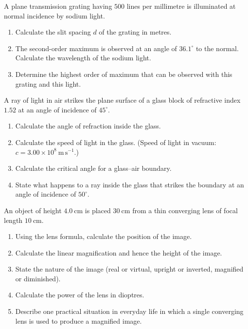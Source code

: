 \documentclass[11pt]{article}
\newcounter{popsec}
\newcounter{popsub}
\newcommand{\courssub}[1]{%
  \stepcounter{popsub}%
  \par\vspace{9pt}\noindent{\popxbold\fontsize{11.5}{13}\selectfont\color{popink}{\color{poporange}\thepopsec.\thepopsub}\hspace{6pt}#1}\par\nopagebreak\vspace{4pt}
}
\begin{document}
\courssub{I practise}

\begin{exercice}
A plane transmission grating having $500$ lines per millimetre is illuminated at normal incidence by sodium light.
\begin{enumerate}
\item Calculate the slit spacing $d$ of the grating in metres.
\item The second-order maximum is observed at an angle of $36.1^{\circ}$ to the normal. Calculate the wavelength of the sodium light.
\item Determine the highest order of maximum that can be observed with this grating and this light.
\end{enumerate}
\end{exercice}

\begin{exercice}
A ray of light in air strikes the plane surface of a glass block of refractive index $1.52$ at an angle of incidence of $45^{\circ}$.
\begin{enumerate}
\item Calculate the angle of refraction inside the glass.
\item Calculate the speed of light in the glass. (Speed of light in vacuum: $c = 3.00\times10^{8}\ \mathrm{m\,s^{-1}}$.)
\item Calculate the critical angle for a glass--air boundary.
\item State what happens to a ray inside the glass that strikes the boundary at an angle of incidence of $50^{\circ}$.
\end{enumerate}
\end{exercice}

\begin{exercice}
An object of height $4.0\ \mathrm{cm}$ is placed $30\ \mathrm{cm}$ from a thin converging lens of focal length $10\ \mathrm{cm}$.
\begin{enumerate}
\item Using the lens formula, calculate the position of the image.
\item Calculate the linear magnification and hence the height of the image.
\item State the nature of the image (real or virtual, upright or inverted, magnified or diminished).
\item Calculate the power of the lens in dioptres.
\item Describe one practical situation in everyday life in which a single converging lens is used to produce a magnified image.
\end{enumerate}
\end{exercice}
\end{document}
